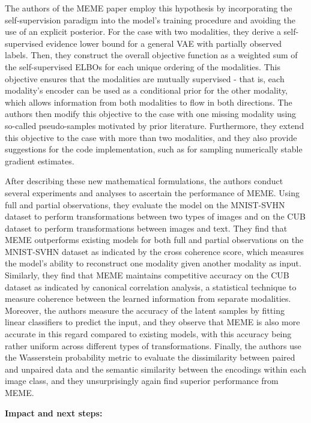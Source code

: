 \documentclass{article}
\begin{document}
The authors of the MEME paper employ this hypothesis by incorporating the self-supervision paradigm into the model's training procedure and avoiding the use of an explicit posterior. For the case with two modalities, they derive a self-supervised evidence lower bound for a general VAE with partially observed labels. Then, they construct the overall objective function as a weighted sum of the self-supervised ELBOs for each unique ordering of the modalities. This objective ensures that the modalities are mutually supervised - that is, each modality's encoder can be used as a conditional prior for the other modality, which allows information from both modalities to flow in both directions. The authors then modify this objective to the case with one missing modality using so-called pseudo-samples motivated by prior literature. Furthermore, they extend this objective to the case with more than two modalities, and they also provide suggestions for the code implementation, such as for sampling numerically stable gradient estimates.

After describing these new mathematical formulations, the authors conduct several experiments and analyses to ascertain the performance of MEME. Using full and partial observations, they evaluate the model on the MNIST-SVHN dataset to perform transformations between two types of images and on the CUB dataset to perform transformations between images and text. They find that MEME outperforms existing models for both full and partial observations on the MNIST-SVHN dataset as indicated by the cross coherence score, which measures the model’s ability to reconstruct one modality given another modality as input. Similarly, they find that MEME maintains competitive accuracy on the CUB dataset as indicated by canonical correlation analysis, a statistical technique to measure coherence between the learned information from separate modalities. Moreover, the authors measure the accuracy of the latent samples by fitting linear classifiers to predict the input, and they observe that MEME is also more accurate in this regard compared to existing models, with this accuracy being rather uniform across different types of transformations. Finally, the authors use the Wasserstein probability metric to evaluate the dissimilarity between paired and unpaired data and the semantic similarity between the encodings within each image class, and they unsurprisingly again find superior performance from MEME.

\textbf{Impact and next steps:}
\end{document}
